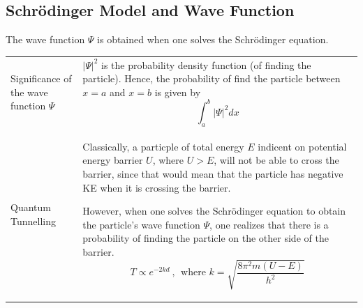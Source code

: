 \documentclass[a4paper,11pt]{article}
\begin{document}
		\subsection{Schr\"{o}dinger Model and Wave Function}
			The wave function $\Psi$ is obtained when one solves the Schr\"{o}dinger equation.
			\begin{center}
				\renewcommand{\arraystretch}{1.6}
				\begin{tabular}{@{} p{3.4cm} p{10.9cm} @{}}
					\toprule
					Significance of the wave function $\Psi$ & $|\Psi|^2$ is the probability density function (of finding the particle). Hence, the probability of find the particle between $x=a$ and $x=b$ is given by $$\int_{a}^{b}|\Psi|^2 dx$$\vspace*{-\baselineskip}\\
					Quantum Tunnelling & Classically, a particple of total energy $E$ indicent on potential energy barrier $U$, where $U>E$, will not be able to cross the barrier, since that would mean that the particle has negative KE when it is crossing the barrier. \par However, when one solves the Schr\"{o}dinger equation to obtain the particle's wave function $\Psi$, one realizes that there is a probability of finding the particle on the other side of the barrier.$$T \propto e^{-2kd}~,~~\textrm{where } k=\sqrt{\frac{8\pi^2m(U-E)}{h^2}}$$ \vspace*{-\baselineskip}\\
					\bottomrule
				\end{tabular}
			\end{center}
\end{document}
